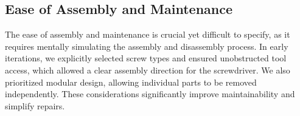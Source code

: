 
\subsection{Ease of Assembly and Maintenance}
\label{sec:ease_to_build}
The ease of assembly and maintenance is crucial yet difficult to specify, as it requires mentally simulating the assembly and disassembly process. In early iterations, we explicitly selected screw types and ensured unobstructed tool access, which allowed a clear assembly direction for the screwdriver. We also prioritized modular design, allowing individual parts to be removed independently. These considerations significantly improve maintainability and simplify repairs.

